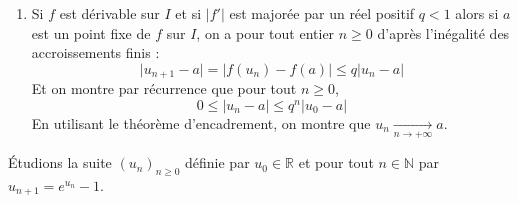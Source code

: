 \documentclass[a4paper,10pt]{report}
\begin{document}
{{\begin{minipage}{16cm}
\begin{enumerate}
\item Si $f$ est dérivable sur $I$ et si $\vert f' \vert$ est majorée par un réel positif $q<1$ alors si $a$ est un point fixe de $f$ sur $I$, on a pour tout entier $n \geq 0$ d'après l'inégalité des accroissements finis :
$$ \vert u_{n+1}- a \vert = \vert f(u_n) - f(a) \vert \leq q \vert u_n -a \vert$$
Et on montre par récurrence que pour tout $n \geq 0$,
$$ 0 \leq \vert u_n - a \vert \leq q^n \vert u_0- a \vert $$
En utilisant le théorème d'encadrement, on montre que $u_n \underset{n \rightarrow + \infty}{\longrightarrow} a$.
\end{enumerate}
 \end{minipage}}}
 
\bigskip
 
\begin{ex} Étudions la suite $(u_n)_{n \geq 0}$ définie par $u_0 \in \mathbb{R}$ et pour tout $n \in \mathbb{N}$ par $u_{n+1}=e^{u_n}-1$.


\end{ex}
\end{document}
